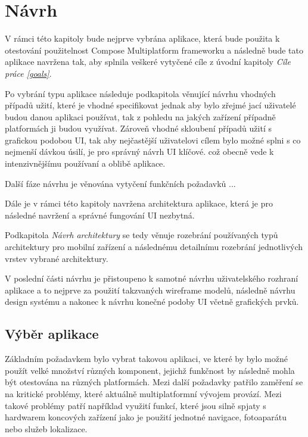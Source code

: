 \chapter{Návrh}
V rámci této kapitoly bude nejprve vybrána aplikace, která bude použita k otestování použitelnost Compose Multiplatform frameworku a následně
bude tato aplikace navržena tak, aby splnila veškeré vytyčené cíle z úvodní kapitoly \textit{Cíle práce \ref{goals}}.

Po vybrání typu aplikace následuje podkapitola věnující návrhu vhodných případů užití, které je vhodné specifikovat jednak aby bylo zřejmé jací 
uživatelé budou danou aplikaci používat, tak z pohledu na jakých zařízení případně platformách ji budou využívat. 
Zároveň vhodné skloubení případů užití s grafickou podobou UI, tak aby nejčastější uživatelovi cílem bylo možné splni s co nejmenší dávkou úsilí, 
je pro správný návrh UI klíčové. 
což obecně vede k intenzivnějšímu používaní a oblibě aplikace.


Další fáze návrhu je věnována vytyčení funkčních požadavků ...

Dále je v rámci této kapitoly navržena architektura aplikace, která je pro následné navržení a správné fungování UI nezbytná. 

Podkapitola \textit{Návrh architektury} se tedy věnuje rozebrání používaných typů architektury pro mobilní zařízení a následnému detailnímu
rozebrání jednotlivých vrstev vybrané architektury.

V poslední části návrhu je přistoupeno k samotné návrhu uživatelského rozhraní aplikace a to nejprve za použití takzvaných wireframe modelů,
následně návrhu design systému a nakonec k návrhu konečné podoby UI včetně grafických prvků.



\section{Výběr aplikace}
Základním požadavkem bylo vybrat takovou aplikaci, ve které by bylo možné použít velké množství různých komponent, jejichž funkčnost by následně mohla být otestována
na různých platformách.
Mezi další požadavky patřilo zaměření se na kritické problémy, které aktuálně multiplatformní vývojem provází. 
Mezi takové problémy patří například využití funkcí, které jsou silně spjaty s hardwarem koncových zařízení jako je použití jednotné navigace, fotoaparátu 
nebo služeb lokalizace.

